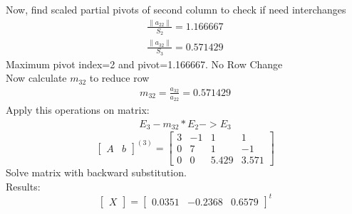 \documentclass{article}
\begin{document}
Now, find scaled partial pivots of second column to check if need interchanges
\begin{align}
	\frac{\|a_{22}\|}{S_{2}}=1.166667\\
	\frac{\|a_{32}\|}{S_{3}}=0.571429
\end{align}
Maximum pivot index=2 and pivot=1.166667. No Row Change\\
Now calculate $m_{32}$ to reduce row 
\begin{align}
	m_{32}=\frac{a_{32}}{a_{22}}=0.571429
\end{align}
Apply this operations on matrix:
\begin{align}
	E_{3}-m_{32}*E_{2}->E_{3}
\end{align}
\[
\left[
\begin{array}{c|c}
A&b
\end{array}
\right]^{(3)}
=
\left[
\begin{array}{ccc|c}
	3&-1&1&1\\
	0&7&1&-1\\
	0&0&5.429&3.571 
\end{array}
\right]
\]
Solve matrix with backward substitution.\\
Results:
\[
\begin{bmatrix}
X
\end{bmatrix}
=
\begin{bmatrix}
	0.0351&-0.2368&0.6579
\end{bmatrix}^t
\]
\end{document}
